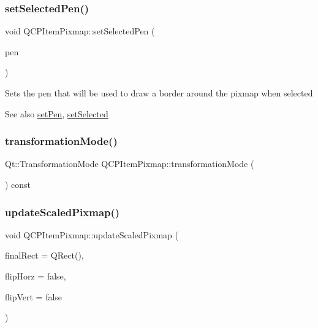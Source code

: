 \subsubsection{\texorpdfstring{setSelectedPen()}{setSelectedPen()}}
{\footnotesize\ttfamily void Q\+C\+P\+Item\+Pixmap\+::set\+Selected\+Pen (\begin{DoxyParamCaption}\item[{const Q\+Pen \&}]{pen }\end{DoxyParamCaption})}

Sets the pen that will be used to draw a border around the pixmap when selected

\begin{DoxySeeAlso}{See also}
\mbox{\hyperlink{class_q_c_p_item_pixmap_acdade1305edb4b5cae14f97fd132065f}{set\+Pen}}, \mbox{\hyperlink{class_q_c_p_abstract_item_a203de94ad586cc44d16c9565f49d3378}{set\+Selected}} 
\end{DoxySeeAlso}
\mbox{\label{class_q_c_p_item_pixmap_ab963aa9693d49c323948f2820a5785b6}} 
\subsubsection{\texorpdfstring{transformationMode()}{transformationMode()}}
{\footnotesize\ttfamily Qt\+::\+Transformation\+Mode Q\+C\+P\+Item\+Pixmap\+::transformation\+Mode (\begin{DoxyParamCaption}{ }\end{DoxyParamCaption}) const\hspace{0.3cm}{\ttfamily [inline]}}

\mbox{\label{class_q_c_p_item_pixmap_a8bced3027b326b290726cd1979c7cfc6}} 
\subsubsection{\texorpdfstring{updateScaledPixmap()}{updateScaledPixmap()}}
{\footnotesize\ttfamily void Q\+C\+P\+Item\+Pixmap\+::update\+Scaled\+Pixmap (\begin{DoxyParamCaption}\item[{Q\+Rect}]{final\+Rect = {\ttfamily QRect()},  }\item[{bool}]{flip\+Horz = {\ttfamily false},  }\item[{bool}]{flip\+Vert = {\ttfamily false} }\end{DoxyParamCaption})\hspace{0.3cm}{\ttfamily [protected]}}



